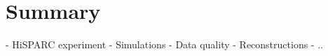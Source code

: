 \chapter{Summary}
\label{ch:summary}

- HiSPARC experiment
- Simulations
- Data quality
- Reconstructions
- ..
